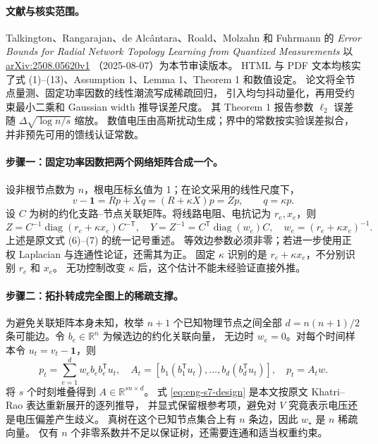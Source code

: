 \paragraph{文献与核实范围。}
Talkington、Rangarajan、de Alcântara、Roald、Molzahn 和 Fuhrmann 的
\emph{Error Bounds for Radial Network Topology Learning from Quantized Measurements}
\citep{S7} 以 \href{https://arxiv.org/html/2508.05620v1}{arXiv:2508.05620v1}
（2025-08-07）为本节审读版本。
HTML 与 PDF 文本均核实了式 (1)--(13)、Assumption 1、Lemma 1、Theorem 1 和数值设定。
论文将全节点量测、固定功率因数的线性潮流写成稀疏回归，
引入均匀抖动量化，再用受约束最小二乘和 Gaussian width 推导误差尺度。
其 Theorem 1 报告参数 $\ell_2$ 误差随 $\Delta\sqrt{\log n/s}$ 缩放。
数值电压由高斯扰动生成；界中的常数按实验误差拟合，并非预先可用的馈线认证常数。

\paragraph{步骤一：固定功率因数把两个网络矩阵合成一个。}
设非根节点数为 $n$，根电压标幺值为 1；在论文采用的线性尺度下，
\begin{equation}
 v-\mathbf1=Rp+Xq=(R+\kappa X)p=Zp,
 \qquad q=\kappa p.
 \label{eq:eng-s7-z}
\end{equation}
设 $C$ 为树的约化支路--节点关联矩阵。将线路电阻、电抗记为 $r_e,x_e$，则
\begin{equation}
 Z=C^{-1}\operatorname{diag}(r_e+\kappa x_e)C^{-\mathsf T},
 \quad Y=Z^{-1}=C^{\mathsf T}\operatorname{diag}(w_e)C,
 \quad w_e=(r_e+\kappa x_e)^{-1}.
 \label{eq:eng-s7-admittance}
\end{equation}
上述是原文式 (6)--(7) 的统一记号重述。
等效边参数必须非零；若进一步使用正权 Laplacian 与连通性论证，还需其为正。
固定 $\kappa$ 识别的是 $r_e+\kappa x_e$，不分别识别 $r_e$ 和 $x_e$。
无功控制改变 $\kappa$ 后，这个估计不能未经验证直接外推。

\paragraph{步骤二：拓扑转成完全图上的稀疏支撑。}
为避免关联矩阵本身未知，枚举 $n+1$ 个已知物理节点之间全部
$d=n(n+1)/2$ 条可能边。令 $b_e\in\mathbb R^n$ 为候选边的约化关联向量，
无边时 $w_e=0$。对每个时间样本令 $u_t=v_t-\mathbf1$，则
\begin{equation}
 p_t=\sum_{e=1}^{d}w_e b_e b_e^{\mathsf T}u_t,
 \quad A_t=[b_1(b_1^{\mathsf T}u_t),\ldots,b_d(b_d^{\mathsf T}u_t)],
 \quad p_t=A_tw.
 \label{eq:eng-s7-design}
\end{equation}
将 $s$ 个时刻堆叠得到 $A\in\mathbb R^{sn\times d}$。
式 \eqref{eq:eng-s7-design} 是本文按原文 Khatri--Rao 表达重新展开的逐列推导，
并显式保留根参考项，避免对 $V$ 究竟表示电压还是电压偏差产生歧义。
真树在这个已知节点集合上有 $n$ 条边，因此 $w_\star$ 是 $n$ 稀疏向量。
仅有 $n$ 个非零系数并不足以保证树，还需要连通和适当权重约束。

